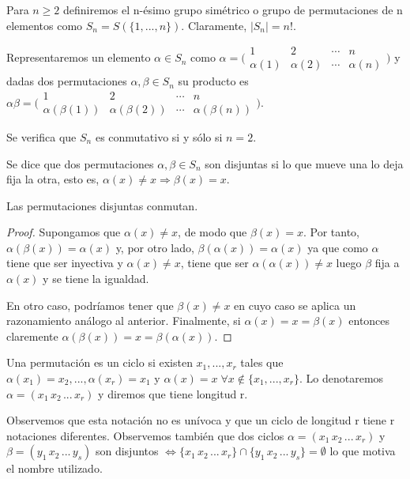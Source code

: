 Para $n \ge 2$ definiremos el n-ésimo grupo simétrico o grupo de permutaciones de n elementos como $S_n = S(\{1,...,n\})$. Claramente, $|S_n| = n!$.

Representaremos un elemento $\alpha \in S_n$ como 
$\alpha = \bigl(\begin{smallmatrix}
  1 & 2 & \cdots & n \\
  \alpha(1) & \alpha(2) & \cdots & \alpha(n) 
\end{smallmatrix}\bigr)$
y dadas dos permutaciones $\alpha,\beta \in S_n$ su producto es 
$\alpha \beta = \bigl(\begin{smallmatrix}
  1 & 2 & \cdots & n \\
  \alpha(\beta(1)) & \alpha(\beta(2)) & \cdots & \alpha(\beta(n)) 
\end{smallmatrix}\bigr)$.

Se verifica que $S_n$ es conmutativo si y sólo si $n=2$.

\begin{ndef}
Se dice que dos permutaciones $\alpha,\beta \in S_n$ son disjuntas si lo que mueve una lo deja fija la otra, esto es, $\alpha(x) \neq x \Rightarrow \beta(x) = x$.
\end{ndef}

\begin{nprop}
Las permutaciones disjuntas conmutan.
\end{nprop}
\begin{proof}
Supongamos que $	\alpha(x) \neq x$, de modo que $\beta(x) = x$. Por tanto, $\alpha(\beta(x)) = \alpha(x)$ y, por otro lado, $\beta(\alpha(x)) = \alpha(x)$ ya que como $\alpha$ tiene que ser inyectiva y $\alpha(x) \neq x$, tiene que ser $\alpha(\alpha(x)) \neq x$ luego $\beta$ fija a $\alpha(x)$ y se tiene la igualdad.

En otro caso, podríamos tener que $\beta(x) \neq x$ en cuyo caso se aplica un razonamiento análogo al anterior. Finalmente, si $\alpha(x) = x = \beta(x)$ entonces claremente $\alpha(\beta(x)) = x = \beta(\alpha(x))$.
\end{proof}

\begin{ndef}[Ciclo]
Una permutación es un ciclo si existen $x_1,...,x_r$ tales que $\alpha(x_1) = x_2,...,\alpha(x_r) = x_1$ y $\alpha(x) = x \; \forall x \notin \{x_1,...,x_r\}$. Lo denotaremos $\alpha = (x_1 \, x_2 \, ... \, x_r)$ y diremos que tiene longitud r. 
\end{ndef}

Observemos que esta notación no es unívoca y que un ciclo de longitud r tiene r notaciones diferentes. Observemos también que dos ciclos $\alpha = (x_1 \, x_2 \, ... \, x_r)$ y $\beta = (y_1 \, x_2 \, ... \, y_s)$ son disjuntos $\iff \{x_1 \, x_2 \, ... \, x_r \} \cap \{y_1 \, x_2 \, ... \, y_s \} = \emptyset$ lo que motiva el nombre utilizado.

